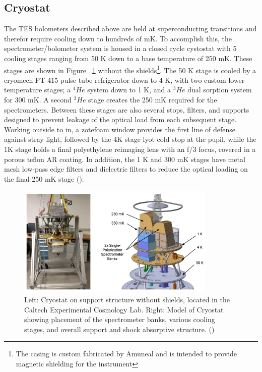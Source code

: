\documentclass[manuscript]{aastex}
\begin{document}
\subsection{Cryostat}
The TES bolometers described above are held at superconducting transitions and therefor require cooling down to hundreds of mK. To accomplish this, the spectrometer/bolometer system is housed in a closed cycle cystostat with 5 cooling stages ranging from 50 K down to a base temperature of 250 mK. These stages are shown in Figure ~\ref{fig:jon1} without the shields\footnote{The casing is custom fabricated by {\sc Amuneal} and is intended to provide magnetic shielding for the instrument}. The 50 K stage is cooled by a cryomech PT-415 pulse tube refrigerator down to 4 K, with two custom lower temperature stages; a \(^{4}He\) system down to 1 K, and a \(^{3}He\) dual sorption system for 300 mK. A second \(^{3}He\) stage creates the 250 mK required for the spectrometers. Between these stages are also several stops, filters, and supports designed to prevent leakage of the optical load from each subsequent stage. Working outside to in, a zotefoam window provides the first line of defense against stray light, followed by the 4K stage lyot cold stop at the pupil, while the 1K stage holds a final polyethylene reimaging lens with an f/3 focus, covered in a porous teflon AR coating. In addition, the 1 K and 300 mK stages have metal mesh low-pass edge filters and dielectric filters to reduce the optical loading on the final 250 mK stage (\cite{Crites2014}).

\begin{figure}[H]
\centering
\captionsetup{width=0.85\textwidth}
\includegraphics[width=0.85\textwidth]{jon1.png}
\caption[TIME Cryostat -(\cite{Hunacek2016})]{Left: Cryostat on support structure without shields, located in the Caltech Experimental Cosmology Lab. Right: Model of Cryostat showing placement of the spectrometer banks, various cooling stages, and overall support and shock absorptive structure. (\cite{Hunacek2016})}
\label{fig:jon1}
\end{figure}
\end{document}
